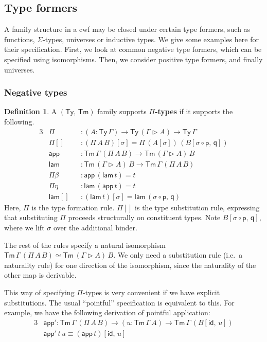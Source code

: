 \documentclass[12pt,a4paper,twoside,openany]{book}
\theoremstyle{remark}
\theoremstyle{definition}
\newtheorem{mydefinition}{Definition}
\newcommand{\ms}[1]{\mathsf{#1}}
\newcommand{\id}{\mathsf{id}}
\newcommand{\Tm}{\mathsf{Tm}}
\newcommand{\Ty}{\mathsf{Ty}}
\newcommand{\ext}{\triangleright}
\newcommand{\p}{\mathsf{p}}
\newcommand{\q}{\mathsf{q}}
\newcommand{\app}{\ms{app}}
\newcommand{\lam}{\ms{lam}}
\begin{document}
\subsection{Type formers}
A family structure in a cwf may be closed under certain type formers, such as
functions, $\Sigma$-types, universes or inductive types. We give some examples
here for their specification. First, we look at common negative type formers,
which can be specified using isomorphisms. Then, we consider positive type
formers, and finally universes.

\subsubsection{Negative types}

\begin{mydefinition}
A $(\Ty,\,\Tm)$ family supports \textbf{$\Pi$-types} if it supports the following.
\begin{alignat*}{3}
  &\Pi           &&: (A : \Ty\,\Gamma) \to \Ty\,(\Gamma\ext A) \to \Ty\,\Gamma\\
  &\ms{\Pi[]}    &&: (\Pi\,A\,B)[\sigma] = \Pi\,(A[\sigma])\,(B[\sigma\circ\p,\,\q])\\
  &\app          &&: \Tm\,\Gamma\,(\Pi\,A\,B) \to \Tm\,(\Gamma \ext A)\,B\\
  &\lam          &&: \Tm\,(\Gamma \ext A)\,B \to \Tm\,\Gamma\,(\Pi\,A\,B)\\
  &\Pi\beta      &&: \app\,(\lam\,t) = t\\
  &\Pi\eta       &&: \lam\,(\app\,t) = t\\
  &\lam[]        &&: (\lam\,t)[\sigma] = \lam\,(\sigma\circ\p,\,\q)
\end{alignat*}
Here, $\Pi$ is the type formation rule. $\ms{\Pi[]}$ is the type substitution
rule, expressing that substituting $\Pi$ proceeds structurally on constituent
types.  Note $B[\sigma\circ\p,\,\q]$, where we lift $\sigma$ over the additional
binder.

The rest of the rules specify a natural isomorphism $\Tm\,\Gamma\,(\Pi\,A\,B)
\simeq \Tm\,(\Gamma \ext A)\,B$. We only need a substitution rule (i.e.\ a
naturality rule) for one direction of the isomorphism, since the naturality of
the other map is derivable.

This way of specifying $\Pi$-types is very convenient if we have explicit
substitutions. The usual ``pointful'' specification is equivalent to this. For
example, we have the following derivation of pointful application:
\begin{alignat*}{3}
  &\app' : \Tm\,\Gamma\,(\Pi\,A\,B) \to (u : \Tm\,\Gamma\,A) \to \Tm\,\Gamma\,(B[\id,\,u])\\
  &\app'\,t\,u \equiv (\app\,t)[\id,\,u]
\end{alignat*}

\end{mydefinition}
\end{document}

